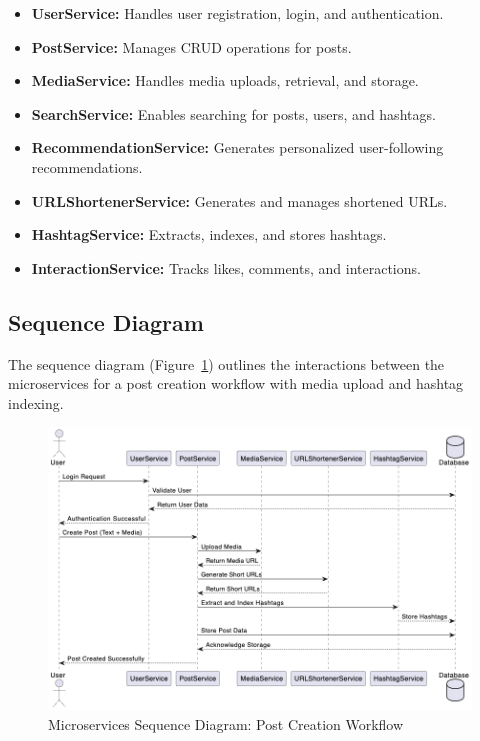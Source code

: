 \documentclass[a4paper,12pt]{article}
\begin{document}
\begin{itemize}
    \item \textbf{UserService:} Handles user registration, login, and authentication.
    \item \textbf{PostService:} Manages CRUD operations for posts.
    \item \textbf{MediaService:} Handles media uploads, retrieval, and storage.
    \item \textbf{SearchService:} Enables searching for posts, users, and hashtags.
    \item \textbf{RecommendationService:} Generates personalized user-following recommendations.
    \item \textbf{URLShortenerService:} Generates and manages shortened URLs.
    \item \textbf{HashtagService:} Extracts, indexes, and stores hashtags.
    \item \textbf{InteractionService:} Tracks likes, comments, and interactions.
\end{itemize}

\subsection{Sequence Diagram}

The sequence diagram (Figure~\ref{fig:microservice-sequence}) outlines the interactions between the microservices for a post creation workflow with media upload and hashtag indexing.

\begin{figure}[H]
    \centering
    \includegraphics[width=0.9\linewidth]{microservice_sequence.png}
    \caption{Microservices Sequence Diagram: Post Creation Workflow}
    \label{fig:microservice-sequence}
\end{figure}
\end{document}
